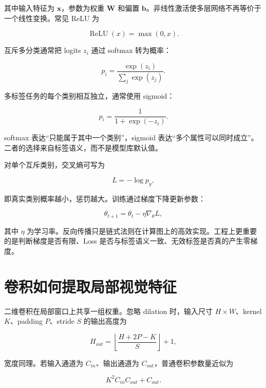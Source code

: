 其中输入特征为 $\mathbf{x}$，参数为权重 $\mathbf{W}$ 和偏置 $\mathbf{b}$。非线性激活使多层网络不再等价于一个线性变换。常见 ReLU 为

\begin{equation}
  \operatorname{ReLU}(x)=\max(0,x).
\end{equation}

互斥多分类通常把 logits $z_i$ 通过 softmax 转为概率：

\begin{equation}
  p_i=\frac{\exp(z_i)}{\sum_j \exp(z_j)}.
\end{equation}

多标签任务的每个类别相互独立，通常使用 sigmoid：

\begin{equation}
  p_i=\frac{1}{1+\exp(-z_i)}.
\end{equation}

softmax 表达“只能属于其中一个类别”，sigmoid 表达“多个属性可以同时成立”。二者的选择来自标签语义，而不是模型库默认值。

对单个互斥类别，交叉熵可写为

\begin{equation}
  L=-\log p_y,
\end{equation}

即真实类别概率越小，惩罚越大。训练通过梯度下降更新参数：

\begin{equation}
  \theta_{t+1}=\theta_t-\eta\nabla_\theta L,
\end{equation}

其中 $\eta$ 为学习率。反向传播只是链式法则在计算图上的高效实现\cite{deep-learning-book,lecun-deep-learning}。工程上更重要的是判断梯度是否有限、Loss 是否与标签语义一致、无效标签是否真的产生零梯度。

\section{卷积如何提取局部视觉特征}

二维卷积在局部窗口上共享一组权重。忽略 dilation 时，输入尺寸 $H\times W$、kernel $K$、padding $P$、stride $S$ 的输出高度为

\begin{equation}
  H_{out}=\left\lfloor\frac{H+2P-K}{S}\right\rfloor+1,
\end{equation}

宽度同理。若输入通道为 $C_{in}$、输出通道为 $C_{out}$，普通卷积参数量近似为

\begin{equation}
  K^2 C_{in}C_{out}+C_{out}.
\end{equation}

